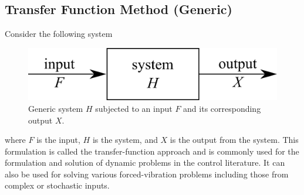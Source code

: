 \documentclass[12pt,letter]{article}
\begin{document}
		\subsection{Transfer Function Method (Generic)}
			Consider the following system

			\begin{figure}[H]
				\centering
				\includegraphics[]{../figures/control_system.png}
				\caption{Generic system $H$ subjected to an input $F$ and its corresponding output $X$.}
				\label{fig:control_system}
			\end{figure}

			\noindent where $F$ is the input, $H$ is the system, and $X$ is the output from the system. This formulation is called the transfer-function approach and is commonly used for the formulation and solution of dynamic problems in the control literature. It can also be used for solving various forced-vibration problems including those from complex or stochastic inputs. 
\end{document}
